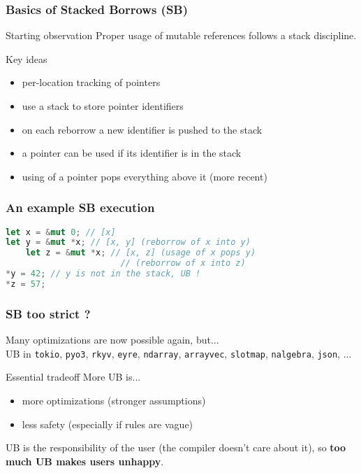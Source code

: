 \begin{frame}
    \frametitle{Basics of Stacked Borrows (SB)}
    \begin{block}{Starting observation}
        Proper usage of mutable references follows a stack discipline.
    \end{block}
    \begin{block}{Key ideas}
        \begin{itemize}
            \item per-location tracking of pointers
            \item use a stack to store pointer identifiers
            \item on each reborrow a new identifier is pushed to the stack
            \item a pointer can be used if its identifier is in the stack
            \item using of a pointer pops everything above it (more recent)
        \end{itemize}
    \end{block}
\end{frame}

\begin{frame}[fragile]
    \frametitle{An example SB execution}
    \begin{block}{}
        \begin{lstlisting}[language=rust]
let x = &mut 0; // [x]
let y = &mut *x; // [x, y] (reborrow of x into y)
    let z = &mut *x; // [x, z] (usage of x pops y)
                       // (reborrow of x into z)
*y = 42; // y is not in the stack, UB !
*z = 57;
        \end{lstlisting}
    \end{block}
\end{frame}

\begin{frame}
    \frametitle{SB too strict ?}
    Many optimizations are now possible again, but...~\\

    UB in \texttt{tokio}, \texttt{pyo3}, \texttt{rkyv}, \texttt{eyre},
    \texttt{ndarray}, \texttt{arrayvec}, \texttt{slotmap}, \texttt{nalgebra},
    \texttt{json}, ...~\\

    \begin{block}{Essential tradeoff}
        More UB is...
        \begin{itemize}
            \item more optimizations (stronger assumptions)
            \item less safety (especially if rules are vague)
        \end{itemize}
    \end{block}
    \begin{block}{}
        UB is the responsibility of the user (the compiler doesn't care about it),
        so \textbf{too much UB makes users unhappy}.
    \end{block}
\end{frame}

